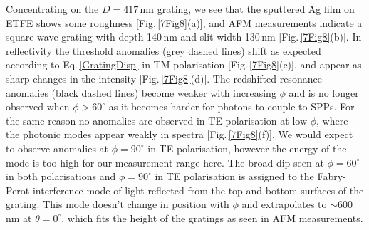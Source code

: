 Concentrating on the $D=417$\,nm grating, we see that the sputtered Ag film on ETFE shows some roughness [Fig.\,\ref{7Fig8}(a)], and AFM measurements indicate a square-wave grating with depth 140\,nm and slit width 130\,nm [Fig.\,\ref{7Fig8}(b)]. In reflectivity the threshold anomalies (grey dashed lines) shift as expected according to Eq.\,\ref{GratingDisp} in TM polarisation [Fig.\,\ref{7Fig8}(c)], and appear as sharp changes in the intensity [Fig.\,\ref{7Fig8}(d)]. The redshifted resonance anomalies (black dashed lines) become weaker with increasing $\phi$ and is no longer observed when $\phi>60^{\circ}$ as it becomes harder for photons to couple to SPPs. For the same reason no anomalies are observed in TE polarisation at low $\phi$, where the photonic modes appear weakly in spectra [Fig.\,\ref{7Fig8}(f)]. We would expect to observe anomalies at $\phi=90^{\circ}$ in TE polarisation, however the energy of the mode is too high for our measurement range here. The broad dip seen at $\phi=60^{\circ}$ in both polarisations and $\phi=90^{\circ}$ in TE polarisation is assigned to the Fabry-Perot interference mode of light reflected from the top and bottom surfaces of the grating. This mode doesn't change in position with $\phi$ and extrapolates to $\sim600$\,nm at $\theta=0^{\circ}$, which fits the height of the gratings as seen in AFM measurements.
